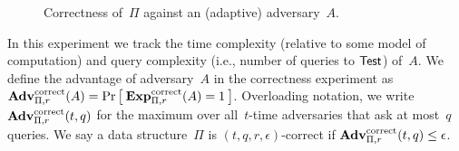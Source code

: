 \begin{figure}[htp]
\centering
{}
\caption{Correctness of~$\Pi$ against an (adaptive) adversary~$A$.}
\label{fig:correctness}
\end{figure}

In this experiment we track the time complexity (relative to some
model of computation) and query complexity (i.e., number of
queries to $\mathsf{Test}$) of~$A$.
We define the advantage of adversary~$A$ in the correctness experiment as
$\mathrm{\mathbf{Adv}}^{\mathrm{correct}}_{\Pi,r}(A) = \Pr\left[\: \mathrm{\mathbf{Exp}}^{\mathrm{correct}}_{\Pi,r}(A)=1 \:\right]$.
Overloading notation, we write $\mathrm{\mathbf{Adv}}^{\mathrm{correct}}_{\Pi,r}(t,q)$ for the maximum over
all~$t$-time adversaries that ask at most~$q$ queries. We say a
data structure~$\Pi$ is $(t,q,r,\epsilon)$-correct if $\mathrm{\mathbf{Adv}}^{\mathrm{correct}}_{\Pi,r}(t,q) \leq \epsilon$.



